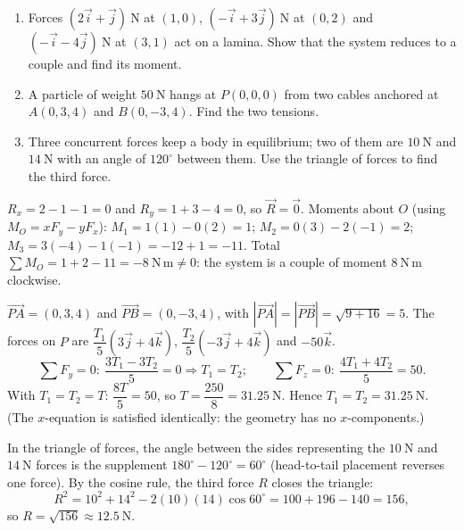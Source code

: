 \documentclass[11pt]{article}
\begin{document}
\begin{exercice}[Practice]
\begin{enumerate}
\item Forces $(2\vec{i}+\vec{j})\ \mathrm{N}$ at $(1,0)$, $(-\vec{i}+3\vec{j})\ \mathrm{N}$ at $(0,2)$ and $(-\vec{i}-4\vec{j})\ \mathrm{N}$ at $(3,1)$ act on a lamina. Show that the system reduces to a couple and find its moment.
\item A particle of weight $50\ \mathrm{N}$ hangs at $P(0,0,0)$ from two cables anchored at $A(0,3,4)$ and $B(0,-3,4)$. Find the two tensions.
\item Three concurrent forces keep a body in equilibrium; two of them are $10\ \mathrm{N}$ and $14\ \mathrm{N}$ with an angle of $120^{\circ}$ between them. Use the triangle of forces to find the third force.
\end{enumerate}
\end{exercice}

\begin{corrige}[Exercise 1]
$R_x = 2 - 1 - 1 = 0$ and $R_y = 1 + 3 - 4 = 0$, so $\vec{R} = \vec{0}$. Moments about $O$ (using $M_O = xF_y - yF_x$): $M_1 = 1(1) - 0(2) = 1$; $M_2 = 0(3) - 2(-1) = 2$; $M_3 = 3(-4) - 1(-1) = -12 + 1 = -11$. Total $\sum M_O = 1 + 2 - 11 = -8\ \mathrm{N\,m} \neq 0$: the system is a couple of moment $8\ \mathrm{N\,m}$ clockwise.
\end{corrige}

\begin{corrige}[Exercise 2]
$\vec{PA} = (0,3,4)$ and $\vec{PB} = (0,-3,4)$, with $|\vec{PA}| = |\vec{PB}| = \sqrt{9+16} = 5$. The forces on $P$ are $\dfrac{T_1}{5}(3\vec{j}+4\vec{k})$, $\dfrac{T_2}{5}(-3\vec{j}+4\vec{k})$ and $-50\vec{k}$.
\[
\sum F_y = 0:\ \frac{3T_1 - 3T_2}{5} = 0 \Rightarrow T_1 = T_2; \qquad
\sum F_z = 0:\ \frac{4T_1 + 4T_2}{5} = 50.
\]
With $T_1 = T_2 = T$: $\dfrac{8T}{5} = 50$, so $T = \dfrac{250}{8} = 31.25\ \mathrm{N}$. Hence $T_1 = T_2 = 31.25\ \mathrm{N}$. (The $x$-equation is satisfied identically: the geometry has no $x$-components.)
\end{corrige}

\begin{corrige}[Exercise 3]
In the triangle of forces, the angle between the sides representing the $10\ \mathrm{N}$ and $14\ \mathrm{N}$ forces is the supplement $180^{\circ} - 120^{\circ} = 60^{\circ}$ (head-to-tail placement reverses one force). By the cosine rule, the third force $R$ closes the triangle:
\[
R^2 = 10^2 + 14^2 - 2(10)(14)\cos 60^{\circ} = 100 + 196 - 140 = 156,
\]
so $R = \sqrt{156} \approx 12.5\ \mathrm{N}$.
\end{corrige}
\end{document}
